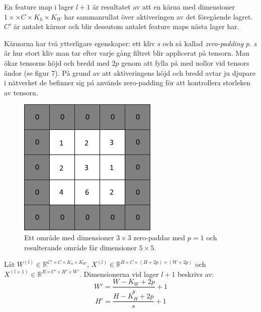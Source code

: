 \documentclass[a4paper,11pt,twoside]{article}
\begin{document}
En feature map i lager $l+1$ är resultatet av att en kärna med dimensioner $1 \times \times C  \times K_h \times K_W$ har sammanrullat över aktiveringen av det föregående lagret. $C'$ är antalet kärnor och blir dessutom antalet feature maps nästa lager har. \cite{cs231n} \cite{convmath}

Kärnorna har två ytterligare egenskaper: ett kliv $s$ och så kallad \textit{zero-padding} $p$. $s$ är hur stort kliv man tar efter varje gång filtret blir applicerat på tensorn. Man ökar tensorns höjd och bredd med $2p$ genom att fylla på med nollor vid tensors ändor (se figur 7). På grund av att aktiveringens höjd och bredd avtar ju djupare i nätverket de befinner sig på används zero-padding för att kontrollera storleken av tensorn. \cite{cs231n} \cite{convmath} \cite{convarithmetic}

\begin{figure}[h]\label{figzeropad}
	\centering
  		\includegraphics[scale=0.7]{zeropadding.png}
  	\caption{Ett område med dimensioner $3 \times 3$ zero-paddas med $p=1$ och resulterande område får dimensioner $5 \times 5$.}
\end{figure}

Låt $W^{(l)} \in \mathbb{R}^{C' \times C  \times K_h \times K_W}$, $X^{(l)} \in \mathbb{R}^{R \times C  \times (H+2p) \times (W+2p)}$ och $X^{(l+1)} \in \mathbb{R}^{R \times C'  \times H' \times W'}$. Dimensionerna vid lager $l+1$ beskrivs av: \cite{cs231n} \cite{convmath} \cite{convarithmetic}
\begin{equation}
W' = \frac{W-K_W+2p}{s} +1
\end{equation}
\begin{equation}
H' = \frac{H-K_H+2p}{s} +1
\end{equation}
\end{document}

